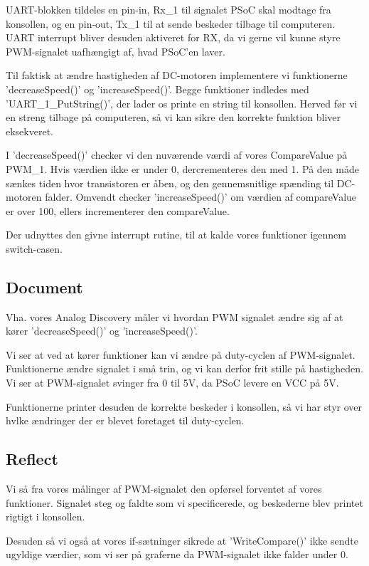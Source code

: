 \documentclass[../main.tex]{subfiles}
\begin{document}
UART-blokken tildeles en pin-in, Rx\_1 til signalet PSoC skal modtage fra konsollen, og en pin-out, Tx\_1 til at sende beskeder tilbage til computeren. UART interrupt bliver desuden aktiveret for RX, da vi gerne vil kunne styre PWM-signalet uafhængigt af, hvad PSoC'en laver.

Til faktisk at ændre hastigheden af DC-motoren implementere vi funktionerne ’decreaseSpeed()’ og ’increaseSpeed()’. Begge funktioner indledes med ’UART\_1\_PutString()’, der lader os printe en string til konsollen. Herved før vi en streng tilbage på computeren, så vi kan sikre den korrekte funktion bliver eksekveret.


I ’decreaseSpeed()’ checker vi den nuværende værdi af vores CompareValue på PWM\_1. Hvis værdien ikke er under 0, dercrementeres den med 1. På den måde sænkes tiden hvor transistoren er åben, og den gennemsnitlige spænding til DC-motoren falder. Omvendt checker 'increaseSpeed()' om værdien af compareValue er over 100, ellers incrementerer den compareValue.

Der udnyttes den givne interrupt rutine, til at kalde vores funktioner igennem switch-casen.

\subsection{Document}
Vha. vores Analog Discovery måler vi hvordan PWM signalet ændre sig af at kører ’decreaseSpeed()’ og ’increaseSpeed()’.


Vi ser at ved at kører funktioner kan vi ændre på duty-cyclen af PWM-signalet. Funktionerne ændre signalet i små trin, og vi kan derfor frit stille på hastigheden. Vi ser at PWM-signalet svinger fra 0 til 5V, da PSoC levere en VCC på 5V.

Funktionerne printer desuden de korrekte beskeder i konsollen, så vi har styr over hvlke ændringer der er blevet foretaget til duty-cyclen.

\subsection{Reflect}    
Vi så fra vores målinger af PWM-signalet den opførsel forventet af vores funktioner. Signalet steg og faldte som vi specificerede, og beskederne blev printet rigtigt i konsollen.

Desuden så vi også at vores if-sætninger sikrede at ’WriteCompare()’ ikke sendte ugyldige værdier, som vi ser på graferne da PWM-signalet ikke falder under 0.
\end{document}
